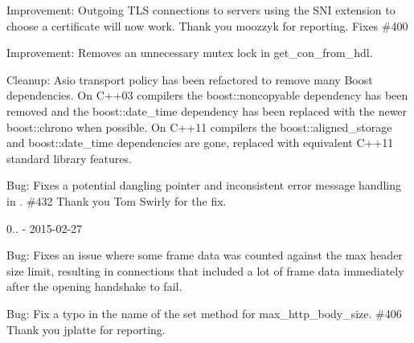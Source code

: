 \begin{DoxyItemize}
\item Improvement\+: Outgoing TLS connections to servers using the SNI extension to choose a certificate will now work. Thank you moozzyk for reporting. Fixes \#400
\item Improvement\+: Removes an unnecessary mutex lock in {\ttfamily get\+\_\+con\+\_\+from\+\_\+hdl}.
\item Cleanup\+: Asio transport policy has been refactored to remove many Boost dependencies. On C++03 compilers the {\ttfamily boost\+::noncopyable} dependency has been removed and the {\ttfamily boost\+::date\+\_\+time} dependency has been replaced with the newer {\ttfamily boost\+::chrono} when possible. On C++11 compilers the {\ttfamily boost\+::aligned\+\_\+storage} and {\ttfamily boost\+::date\+\_\+time} dependencies are gone, replaced with equivalent C++11 standard library features.
\item Bug\+: Fixes a potential dangling pointer and inconsistent error message handling in {\ttfamily {}}. \#432 Thank you Tom Swirly for the fix.
\end{DoxyItemize}

0.. -\/ 2015-\/02-\/27
\begin{DoxyItemize}
\item Bug\+: Fixes an issue where some frame data was counted against the max header size limit, resulting in connections that included a lot of frame data immediately after the opening handshake to fail.
\item Bug\+: Fix a typo in the name of the set method for {\ttfamily max\+\_\+http\+\_\+body\+\_\+size}. \#406 Thank you jplatte for reporting.
\end{DoxyItemize}

